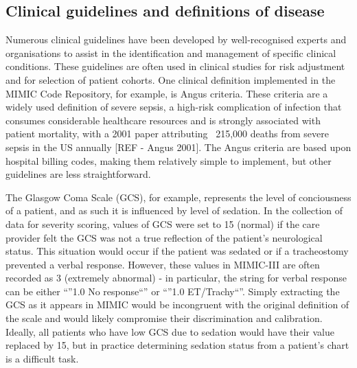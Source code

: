 \documentclass{elsart}
\begin{document}
\subsection{Clinical guidelines and definitions of disease}




Numerous clinical guidelines have been developed by well-recognised experts and organisations to assist in the identification and management of specific clinical conditions. These guidelines are often used in clinical studies for risk adjustment and for selection of patient cohorts. One clinical definition implemented in the MIMIC Code Repository, for example, is Angus criteria. These criteria are a widely used definition of severe sepsis, a high-risk complication of infection that consumes considerable healthcare resources and is strongly associated with patient mortality, with a 2001 paper attributing ~215,000 deaths from severe sepsis in the US annually [REF - Angus 2001]. The Angus criteria are based upon hospital billing codes, making them relatively simple to implement, but other guidelines are less straightforward.

The Glasgow Coma Scale (GCS), for example, represents the level of conciousness of a patient, and as such it is influenced by level of sedation. In the collection of data for severity scoring, values of GCS were set to 15 (normal) if the care provider felt the GCS was not a true reflection of the patient's neurological status. This situation would occur if the patient was sedated or if a tracheostomy prevented a verbal response. However, these values in MIMIC-III are often recorded as 3 (extremely abnormal) - in particular, the string for verbal response can be either ``''1.0 No response``'' or ``''1.0 ET/Trachy``''. Simply extracting the GCS as it appears in MIMIC would be incongruent with the original definition of the scale and would likely compromise their discrimination and calibration. Ideally, all patients who have low GCS due to sedation would have their value replaced by 15, but in practice determining sedation status from a patient's chart is a difficult task.
\end{document}
